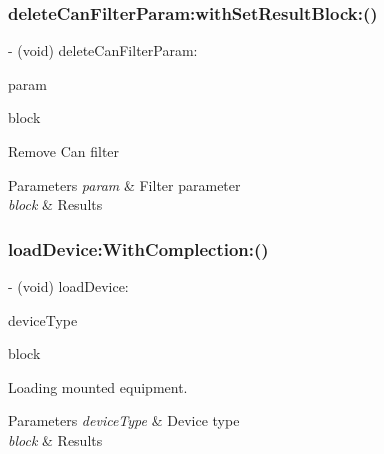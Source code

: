 \subsubsection{\texorpdfstring{delete\+Can\+Filter\+Param\+:with\+Set\+Result\+Block\+:()}{deleteCanFilterParam:withSetResultBlock:()}}
{\footnotesize\ttfamily -\/ (void) delete\+Can\+Filter\+Param\+: \begin{DoxyParamCaption}\item[{(\hyperlink{struct_p_v_s_d_k___m_o_u_n_t_a_p_i___d_e_l___c_a_n___f_i_l_t_e_r}{P\+V\+S\+D\+K\+\_\+\+M\+O\+U\+N\+T\+A\+P\+I\+\_\+\+D\+E\+L\+\_\+\+C\+A\+N\+\_\+\+F\+I\+L\+T\+ER})}]{param }\item[{withSetResultBlock:(P\+V\+Set\+Can\+Filter\+Param\+Result\+Block)}]{block }\end{DoxyParamCaption}}

Remove Can filter


\begin{DoxyParams}{Parameters}
{\em param} & Filter parameter \\
\hline
{\em block} & Results \\
\hline
\end{DoxyParams}
\mbox{\label{interface_p_v_mount_a5438d85f833e406cf1c536aef3261022}} 
\subsubsection{\texorpdfstring{load\+Device\+:\+With\+Complection\+:()}{loadDevice:WithComplection:()}}
{\footnotesize\ttfamily -\/ (void) load\+Device\+: \begin{DoxyParamCaption}\item[{(\hyperlink{group___p_v_s_d_k___c_o_r_e___a_p_i___m_o_u_n_t_c_o_n_t_r_o_l_ga23d329e18c5af08ae082601596435dad}{P\+V\+Mount\+Port\+Type})}]{device\+Type }\item[{WithComplection:(P\+V\+Load\+Device\+Result\+Block)}]{block }\end{DoxyParamCaption}}

Loading mounted equipment.


\begin{DoxyParams}{Parameters}
{\em device\+Type} & Device type \\
\hline
{\em block} & Results \\
\hline
\end{DoxyParams}
\mbox{\label{interface_p_v_mount_a738423b137641196edbbf76c629f207f}} 
